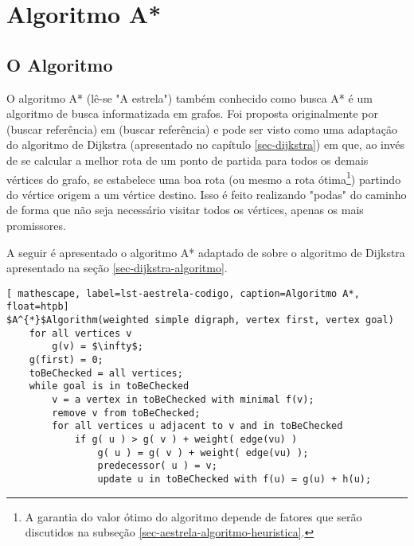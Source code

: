 \chapter{Algoritmo A*}
\label{sec-aestrela}

\section{O Algoritmo}
\label{sec-aestrela-algoritmo}
O algoritmo A* (lê-se "A estrela") também conhecido como busca A* é um algoritmo de busca informatizada em grafos. Foi proposta originalmente por (buscar referência) em (buscar referência) e pode ser visto como uma adaptação do algoritmo de Dijkstra (apresentado no capítulo \ref{sec-dijkstra}) em que, ao invés de se calcular a melhor rota de um ponto de partida para todos os demais vértices do grafo, se estabelece uma boa rota (ou mesmo a rota ótima\footnote{A garantia do valor ótimo do algoritmo depende de fatores que serão discutidos na subseção \ref{sec-aestrela-algoritmo-heuristica}.}) partindo do vértice origem a um vértice destino. Isso é feito realizando "podas" do caminho de forma que não seja necessário visitar todos os vértices, apenas os mais promissores.

A seguir é apresentado o algoritmo A* adaptado de  sobre o algoritmo de Dijkstra apresentado na seção \ref{sec-dijkstra-algoritmo}. 

\begin{lstlisting}[ mathescape, label=lst-aestrela-codigo, caption=Algoritmo A*, float=htpb]
$A^{*}$Algorithm(weighted simple digraph, vertex first, vertex goal)
	for all vertices v
		g(v) = $\infty$;
	g(first) = 0;
	toBeChecked = all vertices;
	while goal is in toBeChecked
		v = a vertex in toBeChecked with minimal f(v);
		remove v from toBeChecked;
		for all vertices u adjacent to v and in toBeChecked
			if g( u ) > g( v ) + weight( edge(vu) )
				g( u ) = g( v ) + weight( edge(vu) );
				predecessor( u ) = v;
				update u in toBeChecked with f(u) = g(u) + h(u);
\end{lstlisting}







